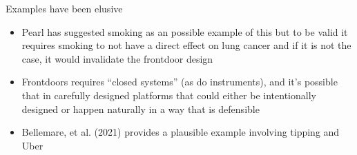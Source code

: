 \documentclass{beamer}
\begin{document}
\begin{frame}{Examples have been elusive}

  \begin{itemize}
    \item Pearl has suggested smoking as an possible example of this but to be valid it requires smoking to not have a direct effect on lung cancer and if it is not the case, it would invalidate the frontdoor design
    \item Frontdoors requires ``closed systems'' (as do instruments), and it's possible that in carefully designed platforms that could either be intentionally designed or happen naturally in a way that is defensible
    \item Bellemare, et al. (2021) provides a plausible example involving tipping and Uber
  \end{itemize}

\end{frame}
\end{document}
